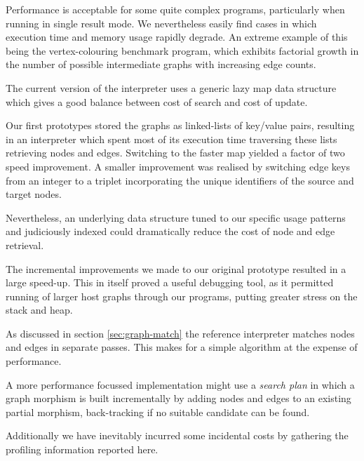 Performance is acceptable for some quite complex programs, particularly when running in single result mode. We nevertheless easily find cases in which execution time and memory usage rapidly degrade. An extreme example of this being the vertex-colouring benchmark program, which exhibits factorial growth in the number of possible intermediate graphs with increasing edge counts.

The current version of the interpreter uses a generic lazy map data structure which gives a good balance between cost of search and cost of update. 

Our first prototypes stored the graphs as linked-lists of key/value pairs, resulting in an interpreter which spent most of its execution time traversing these lists retrieving nodes and edges. Switching to the faster map yielded a factor of two speed improvement. A smaller improvement was realised by switching edge keys from an integer to a triplet incorporating the unique identifiers of the source and target nodes.

Nevertheless, an underlying data structure tuned to our specific usage patterns and judiciously indexed could dramatically reduce the cost of node and edge retrieval.

The incremental improvements we made to our original prototype resulted in a large speed-up. This in itself proved a useful debugging tool, as it permitted running of larger host graphs through our programs, putting greater stress on the stack and heap.


As discussed in section \ref{sec:graph-match} the reference interpreter matches nodes and edges in separate passes. This makes for a simple algorithm at the expense of performance.

A more performance focussed implementation might use a \textit{search plan}\cite{Horvath-Varro07} in which a graph morphism is built incrementally by adding nodes and edges to an existing partial morphism, back-tracking if no suitable candidate can be found.




Additionally we have inevitably incurred some incidental costs by gathering the profiling information reported here.








